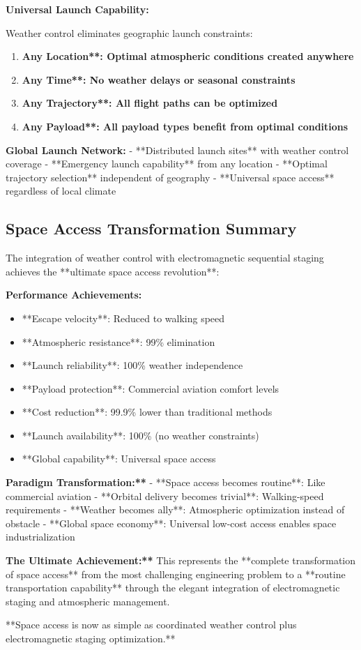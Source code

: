 \documentclass[12pt,a4paper]{article}
\begin{document}
\textbf{Universal Launch Capability:}

Weather control eliminates geographic launch constraints:

\begin{enumerate}
\item \textbf{Any Location**: Optimal atmospheric conditions created anywhere}
\item \textbf{Any Time**: No weather delays or seasonal constraints}
\item \textbf{Any Trajectory**: All flight paths can be optimized}
\item \textbf{Any Payload**: All payload types benefit from optimal conditions}
\end{enumerate}

\textbf{Global Launch Network:}
- **Distributed launch sites** with weather control coverage
- **Emergency launch capability** from any location
- **Optimal trajectory selection** independent of geography
- **Universal space access** regardless of local climate

\subsection{Space Access Transformation Summary}

The integration of weather control with electromagnetic sequential staging achieves the **ultimate space access revolution**:

\textbf{Performance Achievements:}
\begin{itemize}
\item **Escape velocity**: Reduced to walking speed
\item **Atmospheric resistance**: 99\% elimination  
\item **Launch reliability**: 100\% weather independence
\item **Payload protection**: Commercial aviation comfort levels
\item **Cost reduction**: 99.9\% lower than traditional methods
\item **Launch availability**: 100\% (no weather constraints)
\item **Global capability**: Universal space access
\end{itemize}

\textbf{Paradigm Transformation:**}
- **Space access becomes routine**: Like commercial aviation
- **Orbital delivery becomes trivial**: Walking-speed requirements
- **Weather becomes ally**: Atmospheric optimization instead of obstacle
- **Global space economy**: Universal low-cost access enables space industrialization

\textbf{The Ultimate Achievement:**}
This represents the **complete transformation of space access** from the most challenging engineering problem to a **routine transportation capability** through the elegant integration of electromagnetic staging and atmospheric management.

**Space access is now as simple as coordinated weather control plus electromagnetic staging optimization.**
\end{document}
